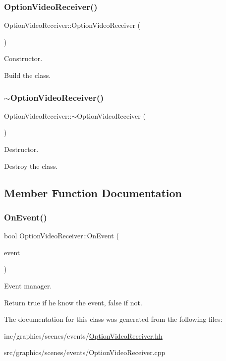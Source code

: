 \subsubsection{\texorpdfstring{Option\+Video\+Receiver()}{OptionVideoReceiver()}}
{\footnotesize\ttfamily Option\+Video\+Receiver\+::\+Option\+Video\+Receiver (\begin{DoxyParamCaption}{ }\end{DoxyParamCaption})}



Constructor. 

Build the class. \mbox{\label{classOptionVideoReceiver_ab014b77305c68f220fa5a0c8e9e57cb9}} 
\subsubsection{\texorpdfstring{$\sim$\+Option\+Video\+Receiver()}{~OptionVideoReceiver()}}
{\footnotesize\ttfamily Option\+Video\+Receiver\+::$\sim$\+Option\+Video\+Receiver (\begin{DoxyParamCaption}{ }\end{DoxyParamCaption})}



Destructor. 

Destroy the class. 

\subsection{Member Function Documentation}
\mbox{\label{classOptionVideoReceiver_a203025900c489eb2df12a6b3471c3caa}} 
\subsubsection{\texorpdfstring{On\+Event()}{OnEvent()}}
{\footnotesize\ttfamily bool Option\+Video\+Receiver\+::\+On\+Event (\begin{DoxyParamCaption}\item[{const irr\+::\+S\+Event \&}]{event }\end{DoxyParamCaption})}



Event manager. 

Return true if he know the event, false if not. 

The documentation for this class was generated from the following files\+:\begin{DoxyCompactItemize}
\item 
inc/graphics/scenes/events/\hyperlink{OptionVideoReceiver_8hh}{Option\+Video\+Receiver.\+hh}\item 
src/graphics/scenes/events/Option\+Video\+Receiver.\+cpp\end{DoxyCompactItemize}
